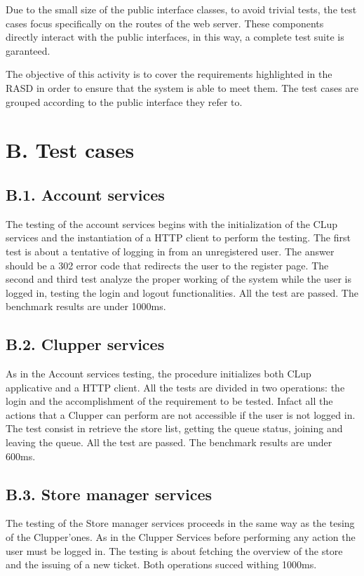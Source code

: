 Due to the small size of the public interface classes, to avoid trivial tests, the test cases focus specifically on the routes of the web server.
These components directly interact with the public interfaces, in this way, a complete test suite is garanteed.

The objective of this activity is to cover the requirements highlighted in the RASD in order to ensure that the system is able to meet them.
The test cases are grouped according to the public interface they refer to.

\section{B. Test cases}

\subsection{B.1. Account services}
The testing of the account services begins with the initialization of the CLup services and the instantiation of a HTTP client to perform the testing.
The first test is about a tentative of logging in from an unregistered user. The answer should be a 302 error code that redirects the user to the register page.
The second and third test analyze the proper working of the system while the user is logged in, testing the login and logout functionalities.
All the test are passed. The benchmark results are under 1000ms.

\subsection{B.2. Clupper services}
As in the Account services testing, the procedure initializes both CLup applicative and a HTTP client.
All the tests are divided in two operations: the login and the accomplishment of the requirement to be tested.
Infact all the actions that a Clupper can perform are not accessible if the user is not logged in.
The test consist in retrieve the store list, getting the queue status, joining and leaving the queue.
All the test are passed. The benchmark results are under 600ms.

\subsection{B.3. Store manager services}
The testing of the Store manager services proceeds in the same way as the tesing of the Clupper'ones.
As in the Clupper Services before performing any action the user must be logged in.
The testing is about fetching the overview of the store and the issuing of a new ticket. Both operations succed withing 1000ms.

